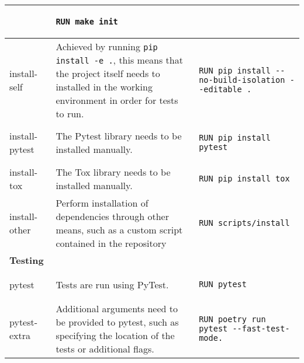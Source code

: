 \documentclass[conference]{IEEEtran}
\begin{document}
\begin{table}[!h]
\begin{tabular}{|lp{}l|}
    & \begin{lstlisting}
RUN make init
    \end{lstlisting}\\ \hline
\multicolumn{1}{|l|}{install-self}       & \multicolumn{1}{p{0.4\textwidth}|}{Achieved by running \texttt{pip install -e .}, this means that the project itself needs to installed in the working environment in order for tests to run.}
    & \begin{lstlisting}
RUN pip install --no-build-isolation --editable .
    \end{lstlisting} \\ \hline
\multicolumn{1}{|l|}{install-pytest}     & \multicolumn{1}{p{0.4\textwidth}|}{The Pytest library needs to be installed manually.} 
    & \begin{lstlisting}
RUN pip install pytest
    \end{lstlisting} \\ \hline
\multicolumn{1}{|l|}{install-tox}        & \multicolumn{1}{p{0.4\textwidth}|}{The Tox library needs to be installed manually.} 
    & \begin{lstlisting}
RUN pip install tox
    \end{lstlisting} \\ \hline
\multicolumn{1}{|l|}{install-other}      & \multicolumn{1}{p{0.4\textwidth}|}{Perform installation of dependencies through other means, such as a custom script contained in the repository}
    & \begin{lstlisting}
RUN scripts/install
    \end{lstlisting} \\ \hline
\textbf{Testing}                         &                                                                                                                                                                                                  &         \\ \hline
\multicolumn{1}{|l|}{pytest}             & \multicolumn{1}{p{0.4\textwidth}|}{Tests are run using PyTest.}
    & \begin{lstlisting}
RUN pytest
    \end{lstlisting} \\ \hline
\multicolumn{1}{|l|}{pytest-extra}       & \multicolumn{1}{p{0.4\textwidth}|}{Additional arguments need to be provided to pytest, such as specifying the location of the tests or additional flags.} 
& \begin{lstlisting}
RUN poetry run pytest --fast-test-mode.
\end{lstlisting} \\ \hline

\end{tabular}
\end{table}
\end{document}
